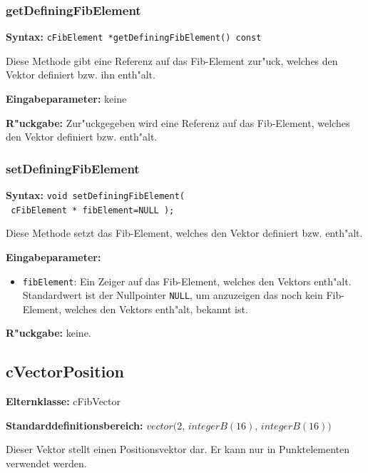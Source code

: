 \subsubsection{getDefiningFibElement}

\textbf{Syntax:} \verb|cFibElement *getDefiningFibElement() const|

\bigskip\noindent
Diese Methode gibt eine Referenz auf das Fib-Element zur"uck, welches den Vektor definiert bzw. ihn enth"alt.

\bigskip\noindent
\textbf{Eingabeparameter:} keine

\bigskip\noindent
\textbf{R"uckgabe:} Zur"uckgegeben wird eine Referenz auf das Fib-Element, welches den Vektor definiert bzw. enth"alt.


\subsubsection{setDefiningFibElement}

\textbf{Syntax:} \verb|void setDefiningFibElement(| \\\verb| cFibElement * fibElement=NULL );|

\bigskip\noindent
Diese Methode setzt das Fib-Element, welches den Vektor definiert bzw. enth"alt.

\bigskip\noindent
\textbf{Eingabeparameter:}
\begin{itemize}
 \item \verb|fibElement|: Ein Zeiger auf das Fib-Element, welches den Vektors enth"alt. Standardwert ist der Nullpointer \verb|NULL|, um anzuzeigen das noch kein Fib-Element, welches den Vektors enth"alt, bekannt ist.
\end{itemize}

\bigskip\noindent
\textbf{R"uckgabe:} keine.



\subsection{cVectorPosition}

\bigskip\noindent
\textbf{Elternklasse:} cFibVector

\bigskip\noindent
\textbf{Standarddefinitionsbereich:} $vector( 2$, $integerB(16)$, $integerB(16) )$

\bigskip\noindent
Dieser Vektor stellt einen Positionsvektor dar. Er kann nur in Punktelementen verwendet werden.


